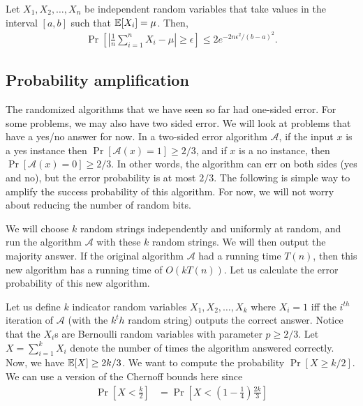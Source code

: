 \begin{theorem}
	Let $X_1, X_2, \ldots, X_n$ be independent random variables that take values in the interval $[a,b]$ such that $\mathbb{E}[X_i] = \mu$. Then,
	\begin{align*}
		\Pr\left[ \left| \frac{1}{n}\sum_{i=1}^n X_i - \mu \right| \geq \epsilon  \right] \leq 2e^{-2n\epsilon^2/(b-a)^2}.
	\end{align*}
	\label{thm:hoeffding}
\end{theorem}

\subsection{Probability amplification}

The randomized algorithms that we have seen so far had one-sided error. For some problems, we may also have two sided error. We will look at problems that have a yes/no answer for now. In a two-sided error algorithm $\mathcal{A}$, if the input $x$ is a yes instance then $\Pr[\mathcal{A}(x)=1] \geq 2/3$, and if $x$ is a no instance, then $\Pr[\mathcal{A}(x)=0] \geq 2/3$. In other words, the algorithm can err on both sides (yes and no), but the error probability is at most $2/3$. The following is simple way to amplify the success probability of this algorithm. For now, we will not worry about reducing the number of random bits.

We will choose $k$ random strings independently and uniformly at random, and run the algorithm $\mathcal{A}$ with these $k$ random strings. We will then output the majority answer. If the original algorithm $\mathcal{A}$ had a running time $T(n)$, then this new algorithm has a running time of $O(kT(n))$. Let us calculate the error probability of this new algorithm.

Let us define $k$ indicator random variables $X_1, X_2, \ldots, X_k$ where $X_i =1$ iff the $i^{th}$ iteration of $\mathcal{A}$ (with the $k^th$ random string) outputs the correct answer. Notice that the $X_i$s are Bernoulli random variables with parameter $p \geq 2/3$. Let $X = \sum_{i=1}^k X_i$ denote the number of times the algorithm answered correctly. Now, we have $\mathbb{E}[X] \geq 2k/3$. We want to compute the probability $\Pr[X \geq k/2]$. We can use a version of the Chernoff bounds here since
\begin{align*}
	\Pr\left[X < \frac{k}{2}\right] &= \Pr\left[ X < \left(1-\frac{1}{4}\right)\frac{2k}{3}  \right]
\end{align*}

